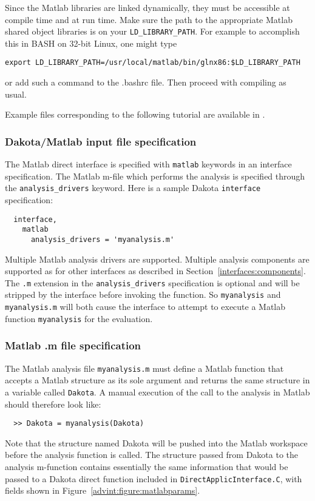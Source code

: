 Since the Matlab libraries are linked dynamically, they must be
accessible at compile time and at run time. Make sure the path to the
appropriate Matlab shared object libraries is on your 
{\tt LD\_LIBRARY\_PATH}. For example to accomplish this in BASH on
32-bit Linux, one might type
\begin{verbatim}
export LD_LIBRARY_PATH=/usr/local/matlab/bin/glnx86:$LD_LIBRARY_PATH
\end{verbatim}
or add such a command to the .bashrc file. Then proceed with
compiling as usual.

Example files corresponding to the following tutorial are available in
.

\subsubsection{Dakota/Matlab input file specification}

The Matlab direct interface is specified with {\tt matlab}
keywords in an interface specification. The Matlab m-file which
performs the analysis is specified through the {\tt analysis\_drivers}
keyword. Here is a sample Dakota {\tt interface} specification:
\begin{small}
\begin{verbatim}
  interface,
    matlab
      analysis_drivers = 'myanalysis.m'
\end{verbatim} 
\end{small}

Multiple Matlab analysis drivers are supported. Multiple analysis
components are supported as for other interfaces as described in
Section~\ref{interfaces:components}. The {\tt .m} extension in the
{\tt analysis\_drivers} specification is optional and will be stripped
by the interface before invoking the function. So {\tt myanalysis}
and {\tt myanalysis.m} will both cause the interface to attempt to
execute a Matlab function {\tt myanalysis} for the evaluation.

\subsubsection{Matlab .m file specification}

The Matlab analysis file {\tt myanalysis.m} must define a Matlab
function that accepts a Matlab structure as its sole argument and
returns the same structure in a variable called {\tt Dakota}. A
manual execution of the call to the analysis in Matlab should
therefore look like:
\begin{small}
\begin{verbatim}
  >> Dakota = myanalysis(Dakota)
\end{verbatim} 
\end{small}
Note that the structure named Dakota will be pushed into the Matlab
workspace before the analysis function is called. The structure
passed from Dakota to the analysis m-function contains essentially the
same information that would be passed to a Dakota direct function
included in {\tt DirectApplicInterface.C}, with fields shown in
Figure~\ref{advint:figure:matlabparams}.

